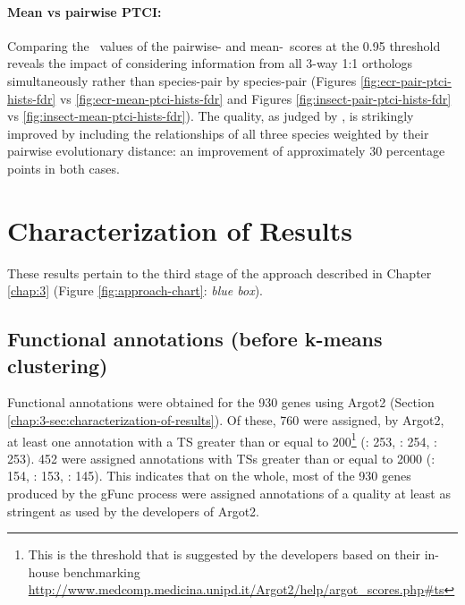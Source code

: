 \paragraph*{Mean vs pairwise PTCI:}
Comparing the \FDR\ values of the pairwise- and mean-\PTCI\ scores at the 0.95 threshold reveals the impact of considering information from all 3-way 1:1 orthologs simultaneously rather than species-pair by species-pair (Figures \ref{fig:ecr-pair-ptci-hists-fdr} vs \ref{fig:ecr-mean-ptci-hists-fdr} and Figures \ref{fig:insect-pair-ptci-hists-fdr} vs \ref{fig:insect-mean-ptci-hists-fdr}).
%
The quality, as judged by \FDR, is strikingly improved by including the relationships of all three species weighted by their pairwise evolutionary distance: an improvement of approximately 30 percentage points in both cases.

\section{Characterization of Results}
These results pertain to the third stage of the approach described in Chapter \ref{chap:3} (Figure \ref{fig:approach-chart}: \textit{blue box}).

\subsection{Functional annotations (before k-means clustering)}

Functional annotations were obtained for the 930 genes using \gls{Argot2} (Section \ref{chap:3-sec:characterization-of-results}).
%
Of these, 760 were assigned, by \gls{Argot2}, at least one annotation with a \gls{TS} greater than or equal to 200\footnote{This is the threshold that is suggested by the developers based on their in-house benchmarking \url{http://www.medcomp.medicina.unipd.it/Argot2/help/argot\_scores.php\#ts}} (\Aa: 253, \Ag: 254, \Cq: 253).
%
452 were assigned annotations with \glspl{TS} greater than or equal to 2000 (\Aa: 154, \Ag: 153, \Cq: 145).
%
This indicates that on the whole, most of the 930 genes produced by the \gls{gFunc} process were assigned annotations of a quality at least as stringent as used by the developers of \gls{Argot2}.








